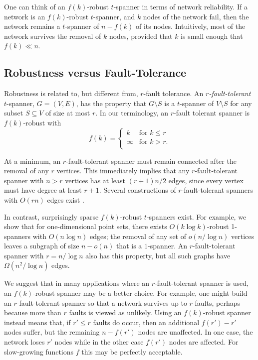 \documentclass{sig-alternate}
\begin{document}
One can think of an $f(k)$-robust $t$-spanner in terms of network
reliability.  If a network is an $f(k)$-robust $t$-spanner, and $k$ nodes
of the network fail, then the network remains a $t$-spanner of $n-f(k)$
of its nodes.  Intuitively, most of the network survives the removal of
$k$ nodes, provided that $k$ is small enough that $f(k)\ll n$.

\subsection{Robustness versus Fault-Tolerance}

Robustness is related to, but different from, $r$-fault tolerance.
An \emph{$r$-fault-tolerant} $t$-spanner, $G=(V,E)$, has the property
that $G\setminus S$ is a $t$-spanner of $V\setminus S$ for any subset
$S\subseteq V$ of size at most $r$.  In our terminology, an $r$-fault
tolerant spanner is $f(k)$-robust with
\[
    f(k) = \begin{cases}k & \text{for $k \le r$}  \\
                   \infty & \text{for $k > r$.}  \\
   \end{cases}
\]

At a minimum, an $r$-fault-tolerant spanner must remain connected
after the removal of any $r$ vertices.  This immediately implies
that any $r$-fault-tolerant spanner with $n>r$ vertices has at least
$(r+1)n/2$ edges, since every vertex must have degree at least $r+1$.
Several constructions of $r$-fault-tolerant spanners with $O(rn)$ edges
exist \cite{cz04,lns02,l99}.

In contrast, surprisingly sparse $f(k)$-robust $t$-spanners exist.
For example, we show that for one-dimensional point sets, there exists
$O(k\log k)$-robust 1-spanners with $O(n\log n)$ edges; the removal of
any set of $o(n/\log n)$ vertices leaves a subgraph of size $n-o(n)$ that
is a $1$-spanner.  An $r$-fault-tolerant spanner with $r=n/\log n$ also
has this property, but all such graphs have $\Omega(n^2/\log n)$ edges.

We suggest that in many applications where an $r$-fault-tolerant spanner
is used, an $f(k)$-robust spanner may be a better choice.  For example,
one might build an $r$-fault-tolerant spanner so that a network survives
up to $r$ faults, perhaps because more than $r$ faults is viewed as
unlikely.  Using an $f(k)$-robust spanner instead means that, if $r'\le
r$ faults do occur, then an additional $f(r')-r'$ nodes suffer, but the
remaining $n-f(r')$ nodes are unaffected.  In one case, the network
loses $r'$ nodes while in the other case $f(r')$ nodes are affected.
For slow-growing functions $f$ this may be perfectly acceptable.
\end{document}
